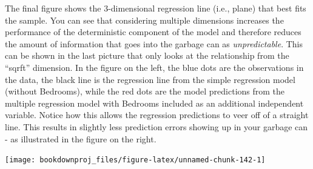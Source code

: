 \documentclass[
]{book}
\newenvironment{Shaded}{\begin{snugshade}}{\end{snugshade}}
\newcommand{\AttributeTok}[1]{\textcolor[rgb]{0.13,0.29,0.53}{#1}}
\newcommand{\DecValTok}[1]{\textcolor[rgb]{0.00,0.00,0.81}{#1}}
\newcommand{\FunctionTok}[1]{\textcolor[rgb]{0.13,0.29,0.53}{\textbf{#1}}}
\newcommand{\NormalTok}[1]{#1}
\newcommand{\SpecialCharTok}[1]{\textcolor[rgb]{0.81,0.36,0.00}{\textbf{#1}}}
\newcommand{\StringTok}[1]{\textcolor[rgb]{0.31,0.60,0.02}{#1}}
\begin{document}
The final figure shows the 3-dimensional regression line (i.e., plane) that best fits the sample. You can see that considering multiple dimensions increases the performance of the deterministic component of the model and therefore reduces the amount of information that goes into the garbage can as \emph{unpredictable}. This can be shown in the last picture that only looks at the relationship from the ``sqrft'' dimension. In the figure on the left, the blue dots are the observations in the data, the black line is the regression line from the simple regression model (without Bedrooms), while the red dots are the model predictions from the multiple regression model with Bedrooms included as an additional independent variable. Notice how this allows the regression predictions to veer off of a straight line. This results in slightly less prediction errors showing up in your garbage can - as illustrated in the figure on the right.

\begin{center}\texttt{[image: bookdownproj\_files/figure-latex/unnamed-chunk-142-1]} \end{center}

\begin{Shaded}
\end{Shaded}
\end{document}
